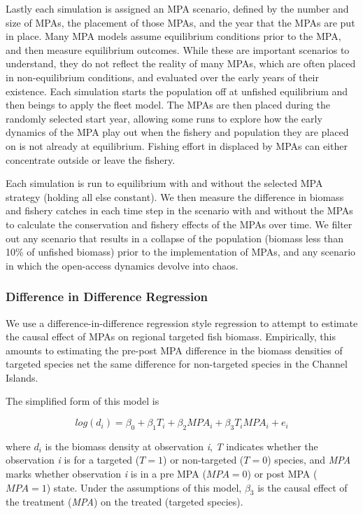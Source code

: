\documentclass[9pt,twocolumn,twoside,lineno]{pnas-new}
\begin{document}
Lastly each simulation is assigned an MPA scenario, defined by the
number and size of MPAs, the placement of those MPAs, and the year that
the MPAs are put in place. Many MPA models assume equilibrium conditions
prior to the MPA, and then measure equilibrium outcomes. While these are
important scenarios to understand, they do not reflect the reality of
many MPAs, which are often placed in non-equilibrium conditions, and
evaluated over the early years of their existence. Each simulation
starts the population off at unfished equilibrium and then beings to
apply the fleet model. The MPAs are then placed during the randomly
selected start year, allowing some runs to explore how the early
dynamics of the MPA play out when the fishery and population they are
placed on is not already at equilibrium. Fishing effort in displaced by
MPAs can either concentrate outside or leave the fishery.

Each simulation is run to equilibrium with and without the selected MPA
strategy (holding all else constant). We then measure the difference in
biomass and fishery catches in each time step in the scenario with and
without the MPAs to calculate the conservation and fishery effects of
the MPAs over time. We filter out any scenario that results in a
collapse of the population (biomass less than 10\% of unfished biomass)
prior to the implementation of MPAs, and any scenario in which the
open-access dynamics devolve into chaos.

\hypertarget{difference-in-difference-regression}{%
\subsubsection{Difference in Difference
Regression}\label{difference-in-difference-regression}}

We use a difference-in-difference regression style regression to attempt
to estimate the causal effect of MPAs on regional targeted fish biomass.
Empirically, this amounts to estimating the pre-post MPA difference in
the biomass densities of targeted species net the same difference for
non-targeted species in the Channel Islands.

The simplified form of this model is

\begin{equation}
  log(d_{i}) = \beta_0 + \beta_1T_{i} +  \beta_2MPA_{i} + \beta_{3}T_iMPA_i + e_{i}
\label{eq:did}
\end{equation}

where \(d_i\) is the biomass density at observation \emph{i}, \emph{T}
indicates whether the observation \emph{i} is for a targeted (\(T = 1\))
or non-targeted (\(T = 0\)) species, and \emph{MPA} marks whether
observation \emph{i} is in a pre MPA (\(MPA = 0\)) or post MPA
(\(MPA = 1\)) state. Under the assumptions of this model, \(\beta_3\) is
the causal effect of the treatment (\emph{MPA}) on the treated (targeted
species).
\end{document}
